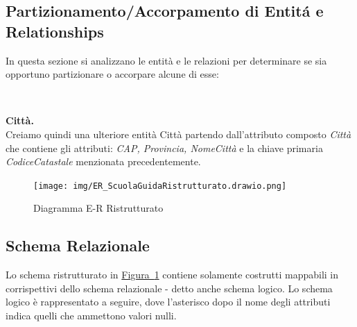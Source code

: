 \documentclass[10pt,twoside]{article}
\begin{document}
{    \subsection{Partizionamento/Accorpamento di Entitá e Relationships}{
        In questa sezione si analizzano le entità e le relazioni per determinare se sia opportuno partizionare o accorpare alcune di esse:

        \

        \textbf{Città.} \\ 
        Creiamo quindi una ulteriore entità Città partendo dall'attributo composto \textit{Città} che contiene gli attributi: \textit{CAP, Provincia, NomeCittà} e la chiave primaria \textit{CodiceCatastale} menzionata precedentemente. \\
    }

    \newpage

    \begin{figure}[H]        
        \texttt{[image: img/ER\_ScuolaGuidaRistrutturato.drawio.png]}\centering
        \caption{Diagramma E-R Ristrutturato}
        \label{fig:diagrammaERristrutturato}
    \end{figure}

    \subsection{Schema Relazionale}{
        Lo schema ristrutturato in \hyperref[fig:diagrammaERristrutturato]{Figura~\ref*{fig:diagrammaERristrutturato}} contiene solamente costrutti mappabili in corrispettivi dello schema relazionale - detto anche schema logico. Lo schema logico è rappresentato a seguire, dove l’asterisco dopo il nome degli attributi indica quelli che ammettono valori nulli.

}}
\end{document}
